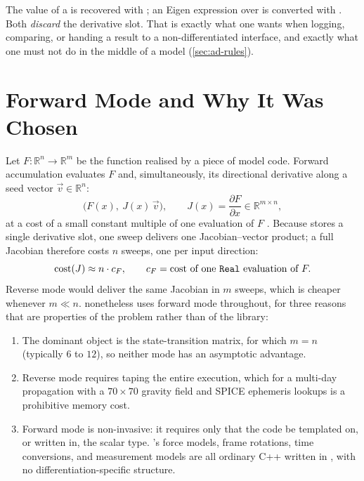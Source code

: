 \begin{lupntnote}
  The value of a  is recovered with ; an Eigen
  expression over  is converted with . Both
  \emph{discard} the derivative slot. That is exactly what one wants when
  logging, comparing, or handing a result to a non-differentiated interface,
  and exactly what one must not do in the middle of a model
  (\cref{sec:ad-rules}).
\end{lupntnote}

\section{Forward Mode and Why It Was Chosen}
\label{sec:ad-forward}

Let $F : \mathbb{R}^{n} \to \mathbb{R}^{m}$ be the function realised by a
piece of \lupnt{} model code. Forward accumulation evaluates $F$ and,
simultaneously, its directional derivative along a seed vector
$\vec{v} \in \mathbb{R}^{n}$:
\begin{equation}
  \label{eq:ad-jvp}
  \big(F(x),\ J(x)\,\vec{v}\big),
  \qquad J(x) = \frac{\partial F}{\partial x} \in \mathbb{R}^{m\times n},
\end{equation}
at a cost of a small constant multiple of one evaluation of $F$
\citep[Ch.~3]{griewank2008}. Because  stores a single derivative
slot, one sweep delivers one Jacobian--vector product; a full Jacobian
therefore costs $n$ sweeps, one per input direction:
\begin{equation}
  \label{eq:ad-cost}
  \mathrm{cost}(J) \approx n \cdot c_{F},
  \qquad c_F = \text{cost of one \texttt{Real} evaluation of } F .
\end{equation}
Reverse mode would deliver the same Jacobian in $m$ sweeps, which is cheaper
whenever $m \ll n$. \lupnt{} nonetheless uses forward mode throughout, for
three reasons that are properties of the problem rather than of the library:

\begin{enumerate}[leftmargin=1.5cm]
  \item The dominant object is the state-transition matrix, for which
    $m = n$ (typically $6$ to $12$), so neither mode has an asymptotic
    advantage.
  \item Reverse mode requires taping the entire execution, which for a
    multi-day propagation with a $70\times70$ gravity field and SPICE
    ephemeris lookups is a prohibitive memory cost.
  \item Forward mode is non-invasive: it requires only that the code be
    templated on, or written in, the scalar type. \lupnt{}'s force models,
    frame rotations, time conversions, and measurement models are all
    ordinary C++ written in , with no differentiation-specific
    structure.
\end{enumerate}

